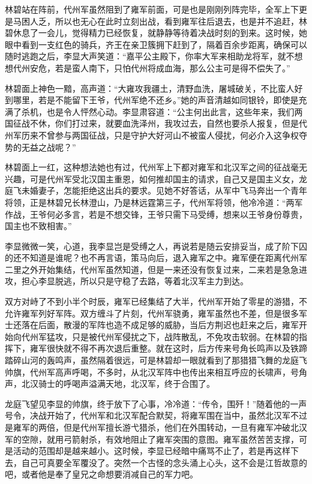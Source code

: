 林碧站在阵前，代州军虽然阻到了雍军前面，可是也是刚刚列阵完毕，全军上下更是马困人乏，所以也无心在此时立刻出战，看到雍军往后退去，也是并不追赶，林碧休息了一会儿，觉得精力已经恢复，就静静等待着决战时刻的到来。这时候，她眼中看到一支红色的骑兵，齐王在亲卫簇拥下赶到了，隔着百余步距离，确保可以随时逃跑之后，李显大声笑道：“嘉平公主殿下，你率大军来相助龙将军，就不想想代州安危，若是蛮人南下，只怕代州将成血海，那么公主可是得不偿失了。”

林碧面上神色一黯，高声道：“大雍攻我疆土，清野血洗，屠城破关，不比蛮人好到哪里，若是不能留下王爷，代州军绝不还乡。”她的声音清越如同银铃，即使是充满了杀机，也是令人怦然心动。李显肃容道：“公主何出此言，这些年来，我们两国征战不休，你们打过来，就要血洗泽州，我攻过去，自然也要杀人报复，但是代州军历来不曾参与两国征战，只是守护大好河山不被蛮人侵扰，何必介入这争权夺势的无益之战呢？”

林碧面上一红，这种想法她也有过，代州军上下都对雍军和北汉军之间的征战毫无兴趣，可是代州军受北汉国主重恩，如何推却国主的请求，自己又是国主义女，龙庭飞未婚妻子，怎能拒绝这出兵的要求。见她不好答话，从军中飞马奔出一个青年将领，正是林碧兄长林澄山，乃是林远霆第三子，代州军将领，他冷冷道：“两军作战，王爷何必多言，若是不想交锋，王爷只需下马受缚，想来以王爷身份尊贵，国主也不致相害。”

李显微微一笑，心道，我李显岂是受缚之人，再说若是随云安排妥当，成了阶下囚的还不知道是谁呢？也不再言语，策马向后，退入雍军之中。雍军便在距离代州军二里之外开始集结，代州军虽然知道，但是一来还没有恢复过来，二来若是急急进攻，担心李显脱逃，所以只是守稳了去路，等着北汉军主力到达。

双方对峙了不到小半个时辰，雍军已经集结了大半，代州军开始了零星的游猎，不允许雍军列好军阵。双方缠斗了片刻，代州军骁勇，雍军虽然也不差，但是很多军士还落在后面，散漫的军阵也造不成足够的威胁，当后方荆迟也赶来之后，雍军开始向代州军猛攻，只是被代州军侵扰之下，战阵散乱，不免攻击软弱。在林碧的指挥下，雍军很快就不得不再次退后重整。就在这时，后方传来号角长鸣声以及铁蹄踏碎山河的轰鸣声，虽然隔着很远，可是林碧却一眼就看到了那猎猎飞舞的龙庭飞帅旗，代州军高声呼喝，不多时，从北汉军阵中也传出来相互呼应的长啸声，号角声，北汉骑士的呼喝声溢满天地，北汉军，终于合围了。

龙庭飞望见李显的帅旗，终于放下了心事，冷冷道：“传令，围歼！”随着他的一声号令，决战开始了，代州军和北汉军配合默契，将雍军围在当中，虽然北汉军不过是雍军的两倍，但是代州军擅长游弋猎杀，他们在外围转动，一旦有雍军冲破北汉军的空隙，就用弓箭射杀，有效地阻止了雍军突围的意图。雍军虽然苦苦支撑，可是活动的范围却是越来越小。这时候，李显已经暗中痛骂不止了，若是再这样下去，自己可真要全军覆没了。突然一个古怪的念头涌上心头，这不会是江哲故意的吧，或者他是奉了皇兄之命想要消减自己的军力吧。

